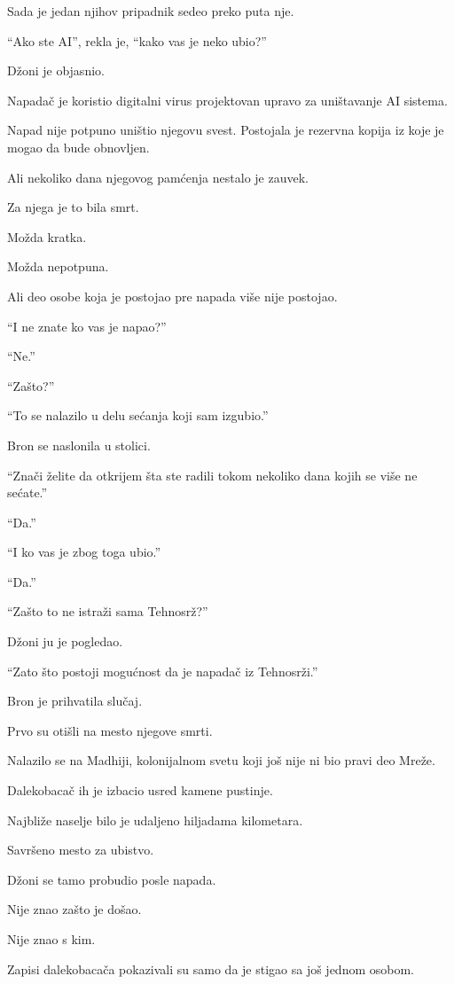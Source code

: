 Sada je jedan njihov pripadnik sedeo preko puta nje.

``Ako ste AI'', rekla je, ``kako vas je neko ubio?''

Džoni je objasnio.

Napadač je koristio digitalni virus projektovan upravo za uništavanje AI sistema.

Napad nije potpuno uništio njegovu svest. Postojala je rezervna kopija iz koje je mogao da bude obnovljen.

Ali nekoliko dana njegovog pamćenja nestalo je zauvek.

Za njega je to bila smrt.

Možda kratka.

Možda nepotpuna.

Ali deo osobe koja je postojao pre napada više nije postojao.

``I ne znate ko vas je napao?''

``Ne.''

``Zašto?''

``To se nalazilo u delu sećanja koji sam izgubio.''

Bron se naslonila u stolici.

``Znači želite da otkrijem šta ste radili tokom nekoliko dana kojih se više ne sećate.''

``Da.''

``I ko vas je zbog toga ubio.''

``Da.''

``Zašto to ne istraži sama Tehnosrž?''

Džoni ju je pogledao.

``Zato što postoji mogućnost da je napadač iz Tehnosrži.''

Bron je prihvatila slučaj.

\bigskip

Prvo su otišli na mesto njegove smrti.

Nalazilo se na Madhiji, kolonijalnom svetu koji još nije ni bio pravi deo Mreže.

Dalekobacač ih je izbacio usred kamene pustinje.

Najbliže naselje bilo je udaljeno hiljadama kilometara.

Savršeno mesto za ubistvo.

Džoni se tamo probudio posle napada.

Nije znao zašto je došao.

Nije znao s kim.

Zapisi dalekobacača pokazivali su samo da je stigao sa još jednom osobom.

